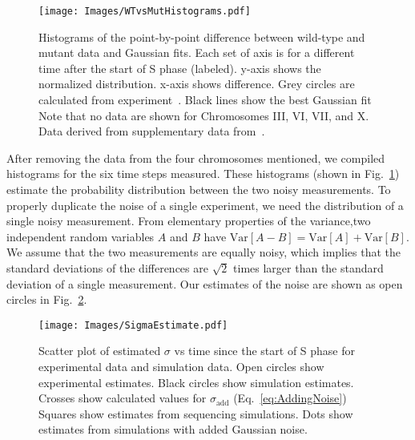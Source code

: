 		\begin{figure}[tbh]
			\begin{center}
				\texttt{[image: Images/WTvsMutHistograms.pdf]}
			\end{center}
				\caption[Estimating Experimental Noise: Point-By-Point Difference Distributions]{\label{fig:HistDifference} Histograms of the point-by-point difference between wild-type and mutant data and Gaussian fits.
					Each set of axis is for a different time after the start of S phase (labeled).
					y-axis shows the normalized distribution.
					x-axis shows difference.
					Grey circles are calculated from experiment~\cite{StochasticTermination}.
					Black lines show the best Gaussian fit
					Note that no data are shown for Chromosomes III, VI, VII, and X.
					Data derived from supplementary data from~\cite{StochasticTermination}.
				}
		\end{figure}
		
		After removing the data from the four chromosomes mentioned, we compiled histograms for the six time steps measured.
		These histograms (shown in Fig.~\ref{fig:HistDifference}) estimate the probability distribution between the two noisy measurements.
		To properly duplicate the noise of a single experiment, we need the distribution of a single noisy measurement.
		From elementary properties of the variance,two independent random variables $A$ and $B$ have $\text{Var}[A-B] = \text{Var}[A] + \text{Var}[B]$.
		We assume that the two measurements are equally noisy, which implies that the standard deviations of the differences are $\sqrt{2}$ times larger than the standard deviation of a single measurement.
		Our estimates of the noise are shown as open circles in Fig.~\ref{fig:Noise}.
		
		\begin{figure}[tbh]
			\begin{center}
				\texttt{[image: Images/SigmaEstimate.pdf]}
			\end{center}
				\caption[Scatter Plot of Estimated Simulation and Experimental Noise]{\label{fig:Noise} 
					Scatter plot of estimated $\sigma$ vs time since the start of S phase for experimental data and simulation data.
					Open circles show experimental estimates.
					Black circles show simulation estimates.
					Crosses show calculated values for $\sigma_\text{add}$ (Eq.~\ref{eq:AddingNoise})
					Squares show estimates from sequencing simulations.
					Dots show estimates from simulations with added Gaussian noise.
				}
		\end{figure}
		
